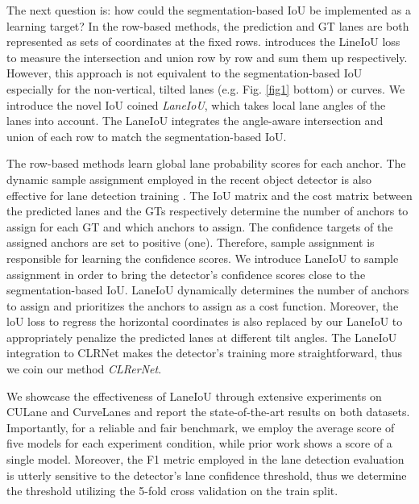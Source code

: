 \documentclass[10pt,twocolumn,letterpaper]{article}
\begin{document}
The next question is: how could the segmentation-based IoU be implemented as a learning target?
In the row-based methods, the prediction and GT lanes are both represented as sets of  coordinates at the fixed rows. 
\cite{Zheng_2022_CVPR} introduces the LineIoU loss to measure the intersection and union row by row and sum them up respectively.
However, this approach is not equivalent to the segmentation-based IoU especially for the non-vertical, tilted lanes (e.g. Fig. \ref{fig1} bottom) or curves.
We introduce the novel IoU coined \textit{LaneIoU}, which takes local lane angles of the lanes into account.
The LaneIoU integrates the angle-aware intersection and union of each row to match the segmentation-based IoU.

The row-based methods learn global lane probability scores for each anchor.
The dynamic sample assignment employed in the recent object detector \cite{ota, YOLOX} is also effective for lane detection training \cite{Zheng_2022_CVPR}. The IoU matrix and the cost matrix between the predicted lanes and the GTs respectively determine the number of anchors to assign for each GT and which anchors to assign.
The confidence targets of the assigned anchors are set to positive (one). Therefore, sample assignment is responsible for learning the confidence scores.
We introduce LaneIoU to sample assignment in order to bring the detector's confidence scores close to the segmentation-based IoU.  LaneIoU dynamically determines the number of anchors to assign and prioritizes the anchors to assign as a cost function.
Moreover, the loU loss to regress the horizontal coordinates is also replaced by our LaneIoU to appropriately penalize the predicted lanes at different tilt angles.
The LaneIoU integration to CLRNet \cite{Zheng_2022_CVPR} makes the detector's training more straightforward, thus we coin our method \textit{CLRerNet}.

We showcase the effectiveness of LaneIoU through extensive experiments on CULane and CurveLanes and report the state-of-the-art results on both datasets.
Importantly, for a reliable and fair benchmark, we employ the average score of five models for each experiment condition, while prior work shows a score of a single model.
Moreover, the F1 metric employed in the lane detection evaluation is utterly sensitive to the detector's lane confidence threshold, thus we determine the threshold utilizing the 5-fold cross validation on the train split.
\end{document}
